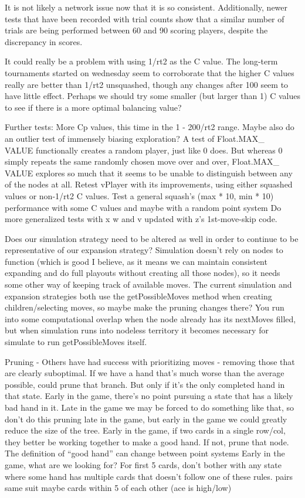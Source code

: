 \documentclass[letterpaper]{article}
\begin{document}
It is not likely a network issue now that it is so consistent. Additionally, newer tests that have been recorded with trial counts show that a similar number of trials are being performed between 60 and 90 scoring players, despite the discrepancy in scores.

It could really be a problem with using 1/rt2 as the C value. The long-term tournaments started on wednesday seem to corroborate that the higher C values really are better than 1/rt2 unsquashed, though any changes after 100 seem to have little effect. Perhaps we should try some smaller (but larger than 1) C values to see if there is a more optimal balancing value?

Further tests: More Cp values, this time in the 1 - 200/rt2 range. Maybe also do an outlier test of immensely biasing exploration? 
	A test of Float.MAX\_\\VALUE functionally creates a random player, just like 0 does. But whereas 0 simply repeats the same randomly chosen move over and over, Float.MAX\_\\VALUE explores so much that it seems to be unable to distinguish between any of the nodes at all.
	Retest vPlayer with its improvements, using either squashed values or non-1/rt2 C values.
	Test a general squash’s (max * 10, min * 10) performance with some C values and maybe with a random point system
	Do more generalized tests with x w and v updated with z’s 1st-move-skip code.

Does our simulation strategy need to be altered as well in order to continue to be representative of our expansion strategy? Simulation doesn’t rely on nodes to function (which is good I believe, as it means we can maintain consistent expanding and do full playouts without creating all those nodes), so it needs some other way of keeping track of available moves. The current simulation and expansion strategies both use the getPossibleMoves method when creating children/selecting moves, so maybe make the pruning changes there? You run into some computational overlap when the node already has its nextMoves filled, but when simulation runs into nodeless territory it becomes necessary for simulate to run getPossibleMoves itself.

Pruning - Others have had success with prioritizing moves - removing those that are clearly suboptimal.
If we have a hand that’s much worse than the average possible, could prune that branch. But only if it’s the only completed hand in that state.
Early in the game, there’s no point pursuing a state that has a likely bad hand in it. Late in the game we may be forced to do something like that, so don’t do this pruning late in the game, but early in the game we could greatly reduce the size of the tree.
Early in the game, if two cards in a single row/col, they better be working together to make a good hand. If not, prune that node.
The definition of “good hand” can change between point systems
Early in the game, what are we looking for? For first 5 cards, don’t bother with any state where some hand has multiple cards that doesn’t follow one of these rules.
pairs
same suit
maybe cards within 5 of each other (ace is high/low)
\end{document}
